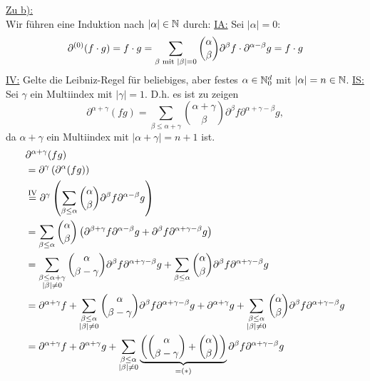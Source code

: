 \begin{lösung}
	\underline{Zu b):}\\
	Wir führen eine Induktion nach $|\alpha|\in\N$ durch:\nl
	\ul{IA:} Sei $|\alpha|=0$: 
	\begin{align*}
		\partial^{(0)}(f\cdot g)=f\cdot g=\sum\limits_{\beta\mit|\beta|=0}\binom{\alpha}{\beta}\partial^\beta f\cdot\partial^{\alpha-\beta} g=f\cdot g
	\end{align*}		
	\ul{IV:} Gelte die Leibniz-Regel für beliebiges, aber festes $\alpha\in\N_0^d$ mit $|\alpha|=n\in\N$.\nl
	\ul{IS:} Sei $\gamma$ ein Multiindex mit $|\gamma|=1$. D.h. es ist zu zeigen
	\begin{equation*}
		\partial^{\alpha + \gamma}(fg) = \displaystyle \sum_{\beta \leq \alpha + \gamma} \binom{\alpha + \gamma}{\beta}\partial^\beta f \partial^{\alpha+\gamma -\beta}g,
	\end{equation*}
	da $\alpha + \gamma$ ein Multiindex mit $|\alpha + \gamma|=n+1$ ist.
	\begin{align*}
		&\partial^{\alpha + \gamma}(fg)\\
		&= \partial^{\gamma}\left( \partial^\alpha(fg) \right)\\
		&\stackeq{\text{IV}} \partial^{\gamma}\left( \displaystyle \sum_{\beta \leq \alpha} \binom{\alpha }{\beta}\partial^\beta f \partial^{\alpha -\beta}g \right)\\
		&= \displaystyle \sum_{\beta \leq \alpha} \binom{\alpha }{\beta} \left( \partial^{\beta+\gamma} f \partial^{\alpha -\beta}g + \partial^{\beta} f \partial^{\alpha +\gamma -\beta}g \right)\\
		&= \displaystyle \sum_{\substack{\beta \leq \alpha + \gamma \\ |\beta|\neq 0}} \binom{\alpha }{\beta - \gamma} \partial^{\beta} f \partial^{\alpha +\gamma -\beta}g + \displaystyle \sum_{\beta \leq \alpha} \binom{\alpha }{\beta}  \partial^{\beta} f \partial^{\alpha +\gamma -\beta}g\\
		&= \partial^{\alpha +\gamma}f + \displaystyle \sum_{\substack{\beta \leq \alpha \\ |\beta|\neq 0}} \binom{\alpha }{\beta - \gamma} \partial^{\beta} f \partial^{\alpha +\gamma -\beta}g + \partial^{\alpha +\gamma}g + \displaystyle \sum_{\substack{\beta \leq \alpha \\ |\beta|\neq 0 }} \binom{\alpha }{\beta}  \partial^{\beta} f \partial^{\alpha +\gamma -\beta}g\\
		&= \partial^{\alpha +\gamma}f + \partial^{\alpha +\gamma}g + \displaystyle \sum_{\substack{\beta \leq \alpha \\ |\beta|\neq 0}} \underbrace{\left( \binom{\alpha }{\beta - \gamma} + \binom{\alpha }{\beta} \right)}_{=(*)} \partial^{\beta} f \partial^{\alpha +\gamma -\beta}g\\

\end{align*}
\end{lösung}
